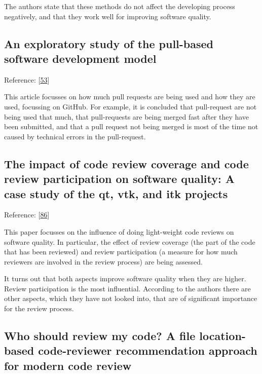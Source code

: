 \documentclass[]{book}
\begin{document}
The authors state that these methods do not affect the developing
process negatively, and that they work well for improving software
quality.

\subsection{An exploratory study of the pull-based software development
model}\label{an-exploratory-study-of-the-pull-based-software-development-model}

Reference: {[}\protect\hyperlink{ref-gousios2014exploratory}{53}{]}

This article focusses on how much pull requests are being used and how
they are used, focussing on GitHub. For example, it is concluded that
pull-request are not being used that much, that pull-requests are being
merged fast after they have been submitted, and that a pull request not
being merged is most of the time not caused by technical errors in the
pull-request.

\subsection{The impact of code review coverage and code review
participation on software quality: A case study of the qt, vtk, and itk
projects}\label{the-impact-of-code-review-coverage-and-code-review-participation-on-software-quality-a-case-study-of-the-qt-vtk-and-itk-projects}

Reference: {[}\protect\hyperlink{ref-mcintosh2014impact}{86}{]}

This paper focusses on the influence of doing light-weight code reviews
on software quality. In particular, the effect of review coverage (the
part of the code that has been reviewed) and review participation (a
measure for how much reviewers are involved in the review process) are
being assessed.

It turns out that both aspects improve software quality when they are
higher. Review participation is the most influential. According to the
authors there are other aspects, which they have not looked into, that
are of significant importance for the review process.

\subsection{Who should review my code? A file location-based
code-reviewer recommendation approach for modern code
review}\label{who-should-review-my-code-a-file-location-based-code-reviewer-recommendation-approach-for-modern-code-review}
\end{document}
